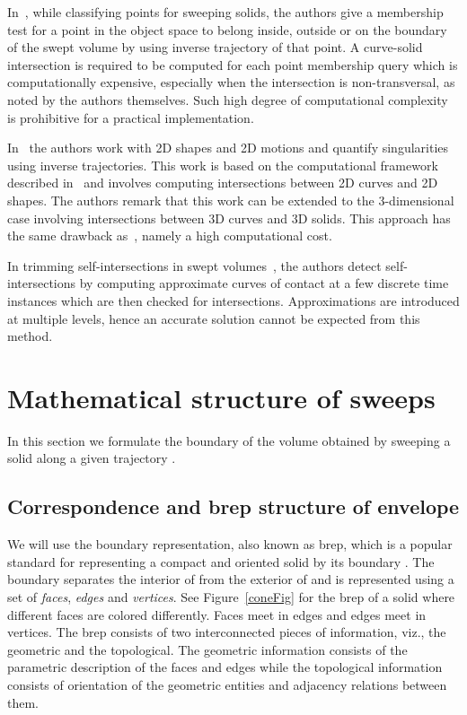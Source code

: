 \documentclass{elsart5p}
\begin{document}
In~\cite{classifyPoints}, while classifying points for sweeping solids, the authors give a membership test for a point in the object space to belong inside, outside or on the boundary of the 
swept volume by using inverse trajectory of that point.  
A curve-solid intersection is required to be computed for each point membership query which is computationally expensive, especially when the intersection is non-transversal, as noted by the authors themselves.  Such high degree of computational complexity is prohibitive for a practical implementation.  

In~\cite{planarSwep} the authors work with 2D shapes and 2D motions and quantify singularities using inverse 
trajectories.  This work is based on the computational framework  described in~\cite{classifyPoints}  and involves computing intersections between 2D curves and 2D shapes. 
The authors remark that this work can be extended to the 3-dimensional case involving intersections between 3D curves and 3D solids.  This approach has the same drawback 
as~\cite{classifyPoints}, namely a high computational cost.

In trimming self-intersections in swept volumes~\cite{selfIntersections}, the authors detect self-intersections by computing approximate curves of contact at a few discrete time instances 
which are then checked for intersections.  Approximations are introduced at multiple levels, hence an accurate solution cannot be expected from this method.
\section{Mathematical structure of sweeps} \label{simpleSec}

In this section we formulate the boundary of the volume obtained by sweeping a solid  along 
a given trajectory .  

\subsection{Correspondence and brep structure of envelope}

We will use the boundary representation, also known as brep, which is a popular standard for 
representing a compact and oriented solid  by its boundary . The boundary  
separates the interior of  from the exterior of  and is represented using a set 
of \emph{faces}, \emph{edges} and \emph{vertices}.  See Figure~\ref{coneFig} for the brep of
a solid where different faces are colored differently.  Faces meet in edges and edges meet in vertices.  
The brep consists of two interconnected pieces of information, viz., 
the geometric and the topological.  The geometric information consists of the parametric description of 
the faces and edges while the topological information consists of orientation of the geometric entities and 
adjacency relations between them.
\end{document}
